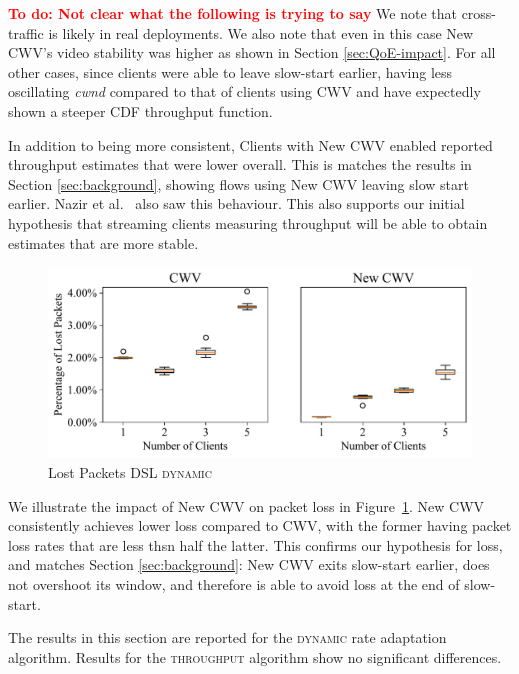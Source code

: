 \documentclass[10pt,sigconf]{acmart}
\newcommand{\todo}[1]{\textbf{\textcolor{red}{To do: #1}}}
\begin{document}
\todo{Not clear what the following is trying to say}
We note that cross-traffic is likely in real deployments. We also note that even in this case New CWV's video stability was higher as shown in Section \ref{sec:QoE-impact}. For all other cases, since clients were able to leave slow-start earlier, having less oscillating \emph{cwnd} compared to that of clients using CWV and have expectedly shown a steeper CDF throughput function. 

In addition to being more consistent, 
Clients with New CWV enabled reported throughput estimates that were lower overall.
This is matches the results in Section \ref{sec:background}, showing flows using New CWV leaving slow start earlier.
Nazir et al.~\cite{Nazir-2014-performance-evaluation-congestion-window-validation-dash-newcwv} also saw this behaviour. This also supports our initial hypothesis that streaming clients measuring throughput will be able to obtain estimates that are more stable. 

\begin{figure}[t!]
  \centering
  \includegraphics[width=.45\textwidth]{figures/lost_packets.pdf}
  \caption{Lost Packets DSL \textsc{dynamic}}
  \label{fig:lost-packets}
\end{figure}

We illustrate the impact of New CWV on packet loss in Figure~\ref{fig:lost-packets}. New CWV consistently achieves lower loss compared to CWV, with the former having packet loss rates that are less thsn half the latter. This confirms our hypothesis for loss, and matches Section \ref{sec:background}: New CWV exits slow-start earlier, does not overshoot its window, and therefore is able to avoid loss at the end of slow-start.

The results in this section are reported for the \textsc{dynamic} rate adaptation algorithm. Results for the \textsc{throughput} algorithm show no significant differences.

\end{document}
